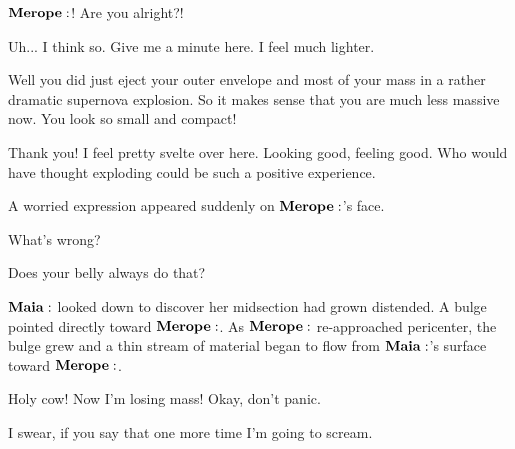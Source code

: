 \Maia $\Merope$! Are you alright?!  

\Merope Uh... I think so.  Give me a minute here.  I feel much lighter.

\Maia Well you did just eject your outer envelope and most of your mass in a rather dramatic supernova explosion.  So it makes sense that you are much less massive now.  You look so small and compact!  

\Merope Thank you!  I feel pretty svelte over here.  Looking good, feeling good.  Who would have thought exploding could be such a positive experience.

A worried expression appeared suddenly on $\Merope$'s face.

\Maia What's wrong?

\Merope Does your belly always do that?

$\Maia$ looked down to discover her midsection had grown distended.  A bulge pointed directly toward $\Merope$.  As $\Merope$ re-approached pericenter, the bulge grew and a thin stream of material began to flow from $\Maia$'s surface toward $\Merope$.

\Maia Holy cow!  Now I'm losing mass! Okay, don't panic.

\Merope I swear, if you say that one more time I'm going to scream.

  

